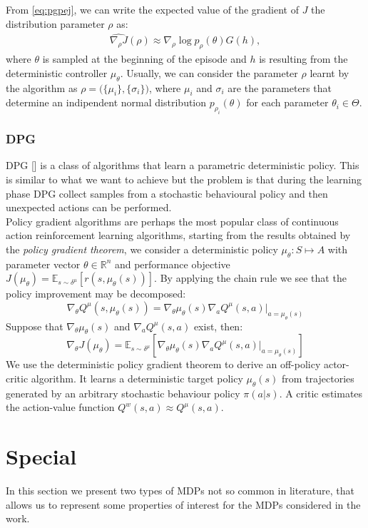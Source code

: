 From \ref{eq:pgpej}, we can write the expected value of the gradient of $J$ \wrt the distribution parameter $\rho$ as:
\begin{align}
	\widehat{\nabla_{\rho}J}(\rho) \approx \nabla_{\rho} \log p_{\rho} (\theta) G(h),
\end{align}
where $\theta$ is sampled at the beginning of the episode and $h$ is resulting from the deterministic controller $\mu_{\theta}$. Usually, we can consider the parameter $\rho$ learnt by the algorithm as $\rho = \Big( \{\mu_i\}, \{\sigma_i\} \Big)$, where $\mu_i$ and $\sigma_i$ are the parameters that determine an indipendent normal distribution $p_{\rho_i}(\theta)$ for each parameter $\theta_i \in \Theta$.  

\subsubsection{DPG} \label{subsec:dpg}
\acf{DPG} [\citet{article}] is a class of algorithms that learn a parametric deterministic policy. This is similar to what we want to achieve but the problem is that during the learning phase \ac{DPG} collect samples from a stochastic behavioural policy and then unexpected actions can be performed.\\
\newline
Policy gradient algorithms are perhaps the most popular class of continuous action reinforcement learning algorithms, starting from the results obtained by the \emph{policy gradient theorem}, we consider a deterministic policy $\mu_{\theta}: S \mapsto A$ with parameter vector $\theta \in \mathbb{R}^n$ and performance objective $J(\mu_{\theta}) = \mathbb{E}_{s \sim \delta^{\mu}}[r(s, \mu_{\theta}(s))]$. 
By applying the chain rule we see that the policy improvement may be decomposed:
$$
\nabla_{\theta} Q^{\mu}(s, \mu_{\theta}(s)) = \nabla_{\theta}\mu_{\theta}(s)\nabla_a Q^{\mu}(s, a)|_{a=\mu_{\theta}(s)}
$$
Suppose that $\nabla_{\theta}\mu_{\theta}(s)$ and $\nabla_aQ^{\mu}(s,a)$ exist, then:
$$
\nabla_{\theta}J(\mu_{\theta}) = \mathbb{E}_{s \sim \delta^{\mu}} [\nabla_{\theta} \mu_{\theta} (s) \nabla_a Q^{\mu}(s,a)|_{a = \mu_{\theta} (s)}]
$$
We use the deterministic policy gradient theorem to derive an off-policy actor-critic algorithm. It learns a deterministic target policy $\mu_{\theta}(s)$ from trajectories generated by an arbitrary stochastic behaviour policy $\pi(a|s)$. A critic estimates the action-value function $Q^w(s,a) \approx Q^{\mu}(s,a)$. 

\section{Special } \label{sec:specmdp}
In this section we present two types of \ac{MDPs} not so common in literature, that allows us to represent some properties of interest for the \ac{MDPs} considered in the work.

